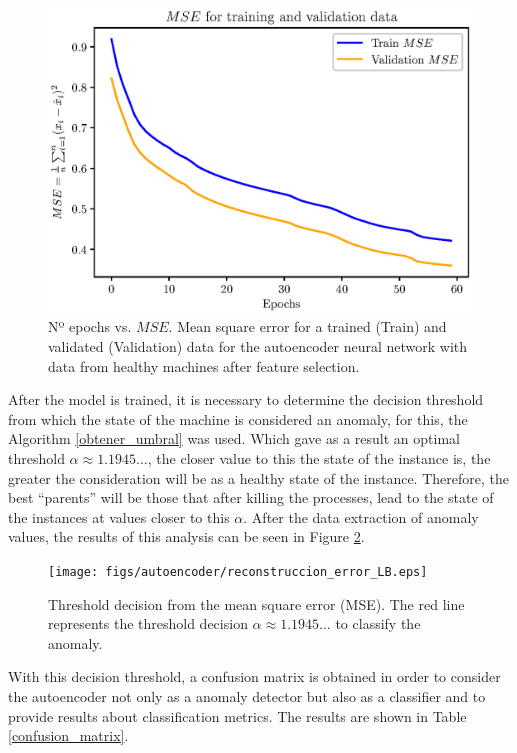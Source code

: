 \documentclass{iosart2c}
\begin{document}
\begin{figure}[h!]
\centering
\includegraphics[scale=0.56]{figs/autoencoder/final_autoencoder.eps}
\caption{Nº epochs vs. $MSE$. Mean square error for a trained (Train) and validated (Validation) data for the autoencoder neural network with data from healthy machines after feature selection.}
\label{fig:autoencoder_variable_selected}
\end{figure}

After the model is trained, it is necessary to determine the decision threshold from which the state of the machine is considered an anomaly, for this, the Algorithm \ref{obtener_umbral} was used. Which gave as a result an optimal threshold $\alpha\approx 1.1945\ldots$, the closer value to this the state of the instance is, the greater the consideration will be as a healthy state of the instance. Therefore, the best ``parents'' will be those that after killing the processes, lead to the state of the instances at values closer to this $\alpha$. After the data extraction of anomaly values, the results of this analysis can be seen in Figure \ref{fig:reconstuction_LB}.\\

\begin{figure}[h!]
\centering
\texttt{[image: figs/autoencoder/reconstruccion\_error\_LB.eps]}
\caption{Threshold decision from the mean square error (MSE). The red line represents the threshold decision $\alpha\approx1.1945\ldots$ to classify the anomaly.}
\label{fig:reconstuction_LB}
\end{figure}

With this decision threshold, a confusion matrix is obtained in order to consider the autoencoder not only as a anomaly detector but also as a classifier and to provide results about classification metrics. The results are shown in Table \ref{confusion_matrix}. \\
\end{document}
